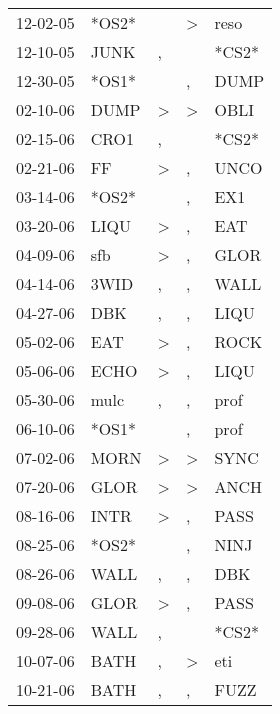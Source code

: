 \begin{supertabular}{lllll}
 12-02-05 &  *OS2* &                  &     \textgreater &   reso \\
 12-10-05 &   JUNK &                , &                  &  *CS2* \\
 12-30-05 &  *OS1* &                  &                , &   DUMP \\
 02-10-06 &   DUMP &     \textgreater &     \textgreater &   OBLI \\
 02-15-06 &   CRO1 &                , &                  &  *CS2* \\
 02-21-06 &     FF &     \textgreater &                , &   UNCO \\
 03-14-06 &  *OS2* &                  &                , &    EX1 \\
 03-20-06 &   LIQU &     \textgreater &                , &    EAT \\
 04-09-06 &    sfb &     \textgreater &                , &   GLOR \\
 04-14-06 &   3WID &                , &                , &   WALL \\
 04-27-06 &    DBK &                , &                , &   LIQU \\
 05-02-06 &    EAT &     \textgreater &                , &   ROCK \\
 05-06-06 &   ECHO &     \textgreater &                , &   LIQU \\
 05-30-06 &   mulc &                , &                , &   prof \\
 06-10-06 &  *OS1* &                  &                , &   prof \\
 07-02-06 &   MORN &     \textgreater &     \textgreater &   SYNC \\
 07-20-06 &   GLOR &     \textgreater &     \textgreater &   ANCH \\
 08-16-06 &   INTR &     \textgreater &                , &   PASS \\
 08-25-06 &  *OS2* &                  &                , &   NINJ \\
 08-26-06 &   WALL &                , &                , &    DBK \\
 09-08-06 &   GLOR &     \textgreater &                , &   PASS \\
 09-28-06 &   WALL &                , &                  &  *CS2* \\
 10-07-06 &   BATH &                , &     \textgreater &    eti \\
 10-21-06 &   BATH &                , &                , &   FUZZ \\

\end{supertabular}
